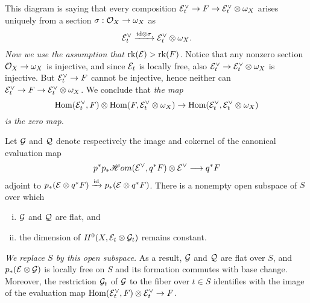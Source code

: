 \documentclass[letterpaper,10pt]{article}
\theoremstyle{remark}
\begin{document}
This diagram is saying that every composition $\mathcal{E}_t^\vee \to F \to \mathcal{E}_t^\vee \otimes \omega_X$ arises uniquely from a section $\sigma: \mathcal{O}_X \to \omega_X$ as 
\[ \mathcal{E}_t^\vee \xrightarrow{\mathrm{id} \otimes \sigma} \mathcal{E}_t^\vee \otimes \omega_X. \] 
\emph{Now we use the assumption that $\operatorname{\mathrm{rk}}(\mathcal{E}) > \operatorname{\mathrm{rk}}(F)$.} Notice that any nonzero section $\mathcal{O}_X \to \omega_X$ is injective, and since $\mathcal{E}_t$ is locally free, also $\mathcal{E}_t^\vee \to \mathcal{E}_t^\vee \otimes \omega_X$ is injective. But $\mathcal{E}_t^\vee \to F$ cannot be injective, hence neither can $\mathcal{E}_t^\vee \to F \to \mathcal{E}_t^\vee \otimes \omega_X$. We conclude that \emph{the map}
\[ \mathrm{Hom}(\mathcal{E}_t^\vee, F) \otimes \mathrm{Hom}(F, \mathcal{E}_t^\vee \otimes \omega_X) \to \mathrm{Hom}(\mathcal{E}_t^\vee, \mathcal{E}_t^\vee \otimes \omega_X) \]
\emph{is the zero map.}

Let $\mathcal{G}$ and $\mathcal{Q}$ denote respectively the image and cokernel of the canonical evaluation map
\[ p^*p_*\mathscr{H}om(\mathcal{E}^\vee, q^*F) \otimes \mathcal{E}^\vee \longrightarrow q^*F \]
adjoint to $p_*(\mathcal{E} \otimes q^*F) \xrightarrow{\mathrm{id}} p_*(\mathcal{E} \otimes q^*F)$. There is a nonempty open subspace of $S$ over which 
\begin{enumerate}[(i)]
    \item $\mathcal{G}$ and $\mathcal{Q}$ are flat, and
    \item the dimension of $H^0(X, \mathcal{E}_t \otimes \mathcal{G}_t)$ remains constant.
\end{enumerate} 
\emph{We replace $S$ by this open subspace.} As a result, $\mathcal{G}$ and $\mathcal{Q}$ are flat over $S$, and $p_*(\mathcal{E} \otimes \mathcal{G})$ is locally free on $S$ and its formation commutes with base change. Moreover, the restriction $\mathcal{G}_t$ of $\mathcal{G}$ to the fiber over $t \in S$ identifies with the image of the evaluation map $\mathrm{Hom}(\mathcal{E}_t^\vee, F) \otimes \mathcal{E}_t^\vee \to F$. 
\end{document}
